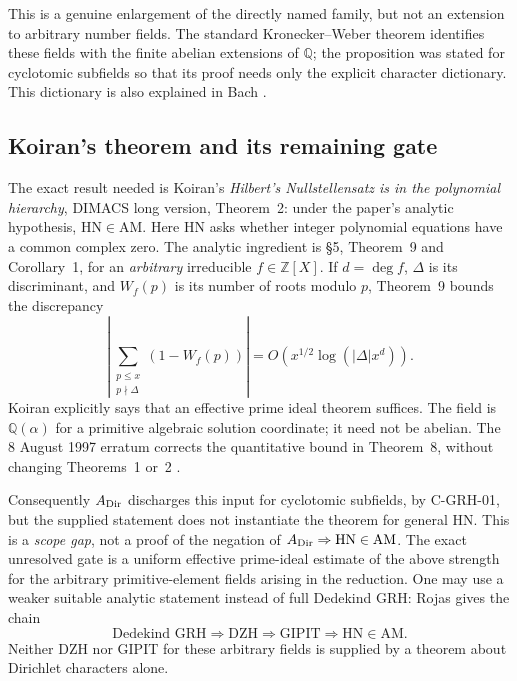 This is a genuine enlargement of the directly named family, but not an
extension to arbitrary number fields.  The standard Kronecker--Weber theorem
identifies these fields with the finite abelian extensions of \(\mathbb Q\);
the proposition was stated for cyclotomic subfields so that its proof needs
only the explicit character dictionary.  This dictionary is also explained
in Bach \cite[\S6, p.~369]{CBach90}.

\subsection{Koiran's theorem and its remaining gate}

The exact result needed is Koiran's \emph{Hilbert's Nullstellensatz is in the
polynomial hierarchy}, DIMACS long version, Theorem~2: under the paper's
analytic hypothesis, \(\mathrm{HN}\in\mathrm{AM}\).  Here HN asks whether
integer polynomial equations have a common complex zero.  The analytic
ingredient is \S5, Theorem~9 and Corollary~1, for an \emph{arbitrary}
irreducible \(f\in\mathbb Z[X]\).  If \(d=\deg f\), \(\Delta\) is its
discriminant, and \(W_f(p)\) is its number of roots modulo \(p\), Theorem~9
bounds the discrepancy
\[
 \left|\sum_{\substack{p\le x\\p\nmid\Delta}}
                 (1-W_f(p))\right|
 =O\!\left(x^{1/2}\log(|\Delta|x^d)\right).
\]
Koiran explicitly says that an effective prime ideal theorem suffices.  The
field is \(\mathbb Q(\alpha)\) for a primitive algebraic solution coordinate;
it need not be abelian.  The 8 August 1997 erratum corrects the quantitative
bound in Theorem~8, without changing Theorems~1 or~2
\cite[Theorem~2; \S5, Theorem~9, Corollary~1; erratum]{CKoiran96}.

Consequently \(A_{\rm Dir}\) discharges this input for cyclotomic subfields,
by C-GRH-01, but the supplied statement does not instantiate the theorem for
general HN.  This is a \emph{scope gap}, not a proof of the negation of
\(A_{\rm Dir}\Rightarrow\mathrm{HN}\in\mathrm{AM}\).  The exact unresolved
gate is a uniform effective prime-ideal estimate of the above strength for
the arbitrary primitive-element fields arising in the reduction.  One may
use a weaker suitable analytic statement instead of full Dedekind GRH:
Rojas \cite[Theorem~1 and Theorem~2]{CRojas03} gives the chain
\[
 \text{Dedekind GRH}\Longrightarrow\mathrm{DZH}
 \Longrightarrow\mathrm{GIPIT}\Longrightarrow\mathrm{HN}\in\mathrm{AM}.
\]
Neither DZH nor GIPIT for these arbitrary fields is supplied by a theorem
about Dirichlet characters alone.

